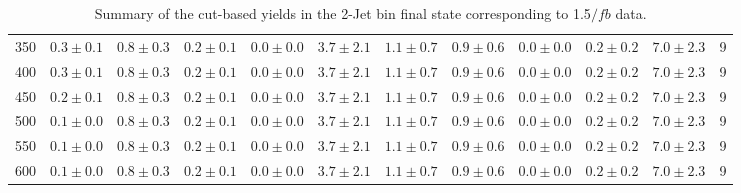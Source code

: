\begin{table}[!hb]
{\begin{center}
\begin{tabular}{l c c c c c c c c c c c }
350 & $0.3\pm0.1$ & $0.8\pm0.3$ & $0.2\pm0.1$ & $0.0\pm0.0$ & $3.7\pm2.1$ & $1.1\pm0.7$ & $0.9\pm0.6$ & $0.0\pm0.0$ & $0.2\pm0.2$ & $7.0\pm2.3$ & 9 \\
400 & $0.3\pm0.1$ & $0.8\pm0.3$ & $0.2\pm0.1$ & $0.0\pm0.0$ & $3.7\pm2.1$ & $1.1\pm0.7$ & $0.9\pm0.6$ & $0.0\pm0.0$ & $0.2\pm0.2$ & $7.0\pm2.3$ & 9 \\
450 & $0.2\pm0.1$ & $0.8\pm0.3$ & $0.2\pm0.1$ & $0.0\pm0.0$ & $3.7\pm2.1$ & $1.1\pm0.7$ & $0.9\pm0.6$ & $0.0\pm0.0$ & $0.2\pm0.2$ & $7.0\pm2.3$ & 9 \\
500 & $0.1\pm0.0$ & $0.8\pm0.3$ & $0.2\pm0.1$ & $0.0\pm0.0$ & $3.7\pm2.1$ & $1.1\pm0.7$ & $0.9\pm0.6$ & $0.0\pm0.0$ & $0.2\pm0.2$ & $7.0\pm2.3$ & 9 \\
550 & $0.1\pm0.0$ & $0.8\pm0.3$ & $0.2\pm0.1$ & $0.0\pm0.0$ & $3.7\pm2.1$ & $1.1\pm0.7$ & $0.9\pm0.6$ & $0.0\pm0.0$ & $0.2\pm0.2$ & $7.0\pm2.3$ & 9 \\
600 & $0.1\pm0.0$ & $0.8\pm0.3$ & $0.2\pm0.1$ & $0.0\pm0.0$ & $3.7\pm2.1$ & $1.1\pm0.7$ & $0.9\pm0.6$ & $0.0\pm0.0$ & $0.2\pm0.2$ & $7.0\pm2.3$ & 9 \\
\hline
\end{tabular}
\end{center}
}
\caption{Summary of the cut-based yields in the 2-Jet bin final state corresponding to 1.5$/fb$ data.}
\end{table}
